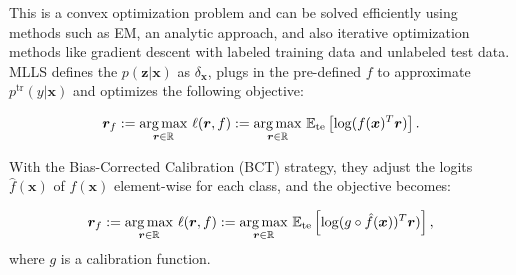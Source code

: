 This is a convex optimization problem and can be solved efficiently using methods such as EM, an analytic approach, and also iterative optimization methods like gradient descent with labeled training data and unlabeled test data. MLLS defines the $p(\boldsymbol{z}|\boldsymbol{x})$ as $\delta_{\boldsymbol{x}}$, plugs in the pre-defined $f$ to approximate $p^{\text{tr}}(y|\boldsymbol{x})$ and optimizes the following objective: 

\begin{align}
\begin{split}
\boldsymbol{r}_f:=\underset{\boldsymbol{r} \in \mathbb{R}}{\operatorname*{arg\,max} } ~ \ell(\boldsymbol{r}, f):=\underset{\boldsymbol{r} \in \mathbb{R}}{\operatorname*{arg\,max} }~ \mathbb{E}_{\text{te}}\left[\log (f(\boldsymbol{x})^T \boldsymbol{r})\right] .
\end{split}
\label{eq:wf_expanded}
\end{align}

With the Bias-Corrected Calibration (BCT) \citep{bct} strategy, they adjust the logits $\hat{f}(\boldsymbol{x})$ of $f(\boldsymbol{x})$ element-wise for each class, and the objective becomes:

\begin{align}
\begin{split}
\boldsymbol{r}_f := \underset{\boldsymbol{r} \in \mathbb{R}}{\operatorname*{arg\,max} } ~ \ell(\boldsymbol{r}, f) := \underset{\boldsymbol{r} \in \mathbb{R}}{\operatorname*{arg\,max}}~ \mathbb{E}_{\text{te}}\left[\log (g\circ \hat{f}(\boldsymbol{x}))^T \boldsymbol{r})\right],
\end{split}
\end{align}
where $g$ is a calibration function.
